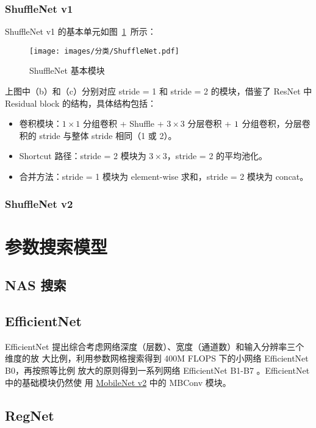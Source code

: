 \subsection{ShuffleNet v1}
ShuffleNet v1 的基本单元如图~\ref{fig:shufflenet}~所示：

\begin{figure}[ht]
  \centering
  \texttt{[image: images/分类/ShuffleNet.pdf]}
  \caption{ShuffleNet 基本模块}
  \label{fig:shufflenet}
\end{figure}

上图中（b）和（c）分别对应 stride = 1 和 stride = 2 的模块，借鉴了 ResNet 中
Residual block 的结构，具体结构包括：

\begin{itemize}
  \item 卷积模块：$1 \times 1$ 分组卷积 + Shuffle + $3 \times 3$ 分层卷积 + $1
    \time 1$ 分组卷积，分层卷积的 stride 与整体 stride 相同（1 或 2）。
  \item Shortcut 路径：stride = 2 模块为 $3 \times 3$，stride = 2 的平均池化。
  \item 合并方法：stride = 1 模块为 element-wise 求和，stride = 2 模块为 concat。
\end{itemize}

\subsection{ShuffleNet v2}

\chapter{参数搜索模型}

\section{NAS 搜索}

\section{EfficientNet}
EfficientNet 提出综合考虑网络深度（层数）、宽度（通道数）和输入分辨率三个维度的放
大比例，利用参数网格搜索得到 400M FLOPS 下的小网络 EfficientNet B0，再按照等比例
放大的原则得到一系列网络 EfficientNet B1-B7
\cite{2019-EfficientNet}。EfficientNet中的基础模块仍然使
用 \hyperref[subsec:MobileNetv2]{MobileNet v2} 中的 MBConv 模块。

\section{RegNet}

